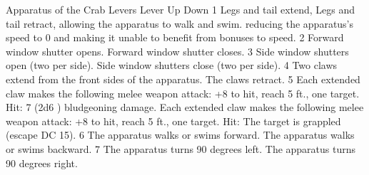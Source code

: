 Apparatus of the Crab Levers
Lever                                      Up                                                                                                                                    Down                                                                                                                                                
1                                          Legs and tail extend,                                                                                                                 Legs and tail retract,                                                                                                                              
allowing the apparatus  to walk and swim.  reducing the apparatus's  speed to 0 and making it  unable to benefit from  bonuses to speed.                                         
2                                          Forward window shutter  opens.                                                                                                        Forward window shutter  closes.                                                                                                                     
3                                          Side window shutters  open (two per side).                                                                                            Side window shutters  close (two per side).                                                                                                         
4                                          Two claws  extend from  the front sides of the  apparatus.                                                                            The claws retract.                                                                                                                                  
5                                          Each extended claw  makes the following  melee weapon attack:  +8 to hit, reach 5 ft., one target. Hit: 7 (2d6 ) bludgeoning damage.  Each extended claw  makes the following  melee weapon attack:   +8  to hit, reach 5 ft., one  target. Hit: The target is  grappled (escape DC 15).  
6                                          The apparatus walks or  swims forward.                                                                                                The apparatus walks or  swims backward.                                                                                                             
7                                          The apparatus turns 90  degrees left.                                                                                                 The apparatus turns 90  degrees right.                                                                                                              
